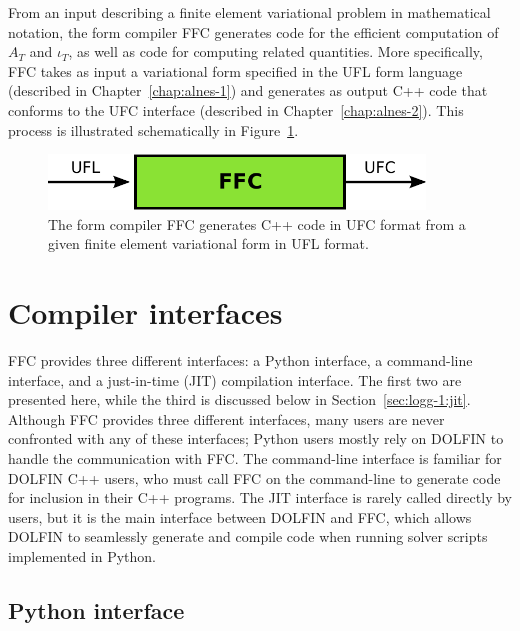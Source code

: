 From an input describing a finite element variational problem in
mathematical notation, the form compiler FFC generates code for the
efficient computation of $A_T$ and $\iota_T$, as well as code for
computing related quantities. More specifically, FFC takes as input a
variational form specified in the UFL form language (described in
Chapter~\ref{chap:alnes-1}) and generates as output C++ code that
conforms to the UFC interface (described in
Chapter~\ref{chap:alnes-2}). This process is illustrated schematically
in Figure~\ref{fig:logg-1:formcompiler}.

\begin{figure}
  \begin{center}
    \includegraphics[width=10cm]{chapters/logg-1/pdf/ufl_ffc_ufc.pdf}
    \caption{The form compiler FFC generates C++ code in UFC format
      from a given finite element variational form in UFL format.}
    \label{fig:logg-1:formcompiler}
  \end{center}
\end{figure}

\section{Compiler interfaces}

FFC provides three different interfaces: a Python interface,
a command-line interface, and a just-in-time (JIT) compilation
interface. The first two are presented here, while the third is discussed
below in Section~\ref{sec:logg-1:jit}. Although FFC provides three
different interfaces, many users are never confronted with any of these
interfaces; Python users mostly rely on DOLFIN to handle the communication
with FFC. The command-line interface is familiar for DOLFIN C++ users,
who must call FFC on the command-line to generate code for inclusion in
their C++ programs. The JIT interface is rarely called directly by users,
but it is the main interface between DOLFIN and FFC, which allows DOLFIN
to seamlessly generate and compile code when running solver scripts
implemented in Python.

\subsection{Python interface}

